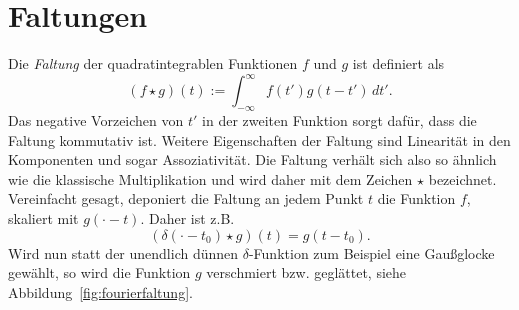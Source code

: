 \section{Faltungen}

Die \emph{Faltung} der quadratintegrablen Funktionen $f$ und $g$ ist
definiert als
\begin{equation}
  (f \star g)(t) := \int_{-\infty}^{\infty} f(t')g(t-t')\,dt'.
\end{equation}
Das negative Vorzeichen von $t'$ in der zweiten Funktion sorgt
dafür, dass die Faltung kommutativ ist. Weitere Eigenschaften der
Faltung sind Linearität in den Komponenten und sogar
Assoziativität. Die Faltung verhält sich also so ähnlich wie die
klassische Multiplikation und wird daher mit dem Zeichen $\star$
bezeichnet.  Vereinfacht gesagt, deponiert die Faltung an jedem Punkt
$t$ die Funktion $f$, skaliert mit $g(\cdot - t) $. Daher ist z.B.
\begin{equation}
  (\delta(\cdot - t_0) \star g)(t) = g(t - t_0).
\end{equation}
Wird nun statt der unendlich dünnen $\delta$-Funktion zum Beispiel
eine Gaußglocke gewählt, so wird die Funktion $g$ verschmiert
bzw. geglättet, siehe Abbildung~\ref{fig:fourierfaltung}.

